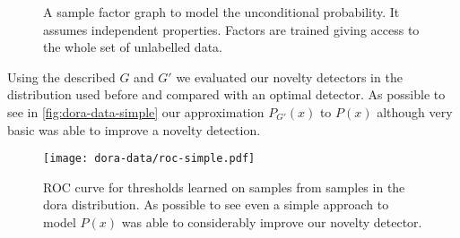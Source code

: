 \documentclass[a4paper]{article}
\begin{document}
\begin{figure}[h]
\centering
{}
\caption{A sample factor graph to model the unconditional probability. It assumes independent properties. Factors are trained giving access to the whole set of unlabelled data.}
\end{figure}

Using the described $G$ and $G'$ we evaluated our novelty detectors in the distribution used before and compared with an optimal detector.
As possible to see in \autoref{fig:dora-data-simple} our approximation $P_{G'}(x)$ to $P(x)$ although very basic was able to improve a novelty detection.


\begin{figure}[h]
\centering
\texttt{[image: dora-data/roc-simple.pdf]}
\caption{ROC curve for thresholds learned on samples from samples in the dora distribution. As possible to see even a simple approach to model $P(x)$ was able to considerably improve our novelty detector.}
\label{fig:dora-data-simple}
\end{figure}





\cleardoublepage
{}
{}



\end{document}
